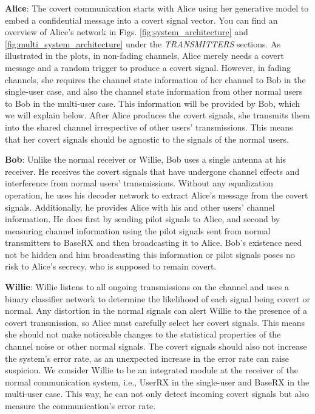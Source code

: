 \textbf{Alice}: The covert communication starts with Alice using her generative model to embed a confidential message into a covert signal vector. You can find an overview of Alice's network in Figs. \ref{fig:system_architecture} and \ref{fig:multi_system_architecture} under the \textit{TRANSMITTERS} sections. As illustrated in the plots, in non-fading channels, Alice merely needs a covert message and a random trigger to produce a covert signal. However, in fading channels, she requires the channel state information of her channel to Bob in the single-user case, and also the channel state information from other normal users to Bob in the multi-user case. This information will be provided by Bob, which we will explain below. After Alice produces the covert signals, she transmits them into the shared channel irrespective of other users' transmissions. This means that her covert signals should be agnostic to the signals of the normal users.

\textbf{Bob}: Unlike the normal receiver or Willie, Bob uses a single antenna at his receiver. He receives the covert signals that have undergone channel effects and interference from normal users' transmissions. Without any equalization operation, he uses his decoder network to extract Alice's message from the covert signals. Additionally, he provides Alice with his and other users' channel information. He does first by sending pilot signals to Alice, and second by measuring channel information using the pilot signals sent from normal transmitters to BaseRX and then broadcasting it to Alice. Bob's existence need not be hidden and him broadcasting this information or pilot signals poses no risk to Alice's secrecy, who is supposed to remain covert.

\textbf{Willie}: Willie listens to all ongoing transmissions on the channel and uses a binary classifier network to determine the likelihood of each signal being covert or normal. Any distortion in the normal signals can alert Willie to the presence of a covert transmission, so Alice must carefully select her covert signals. This means she should not make noticeable changes to the statistical properties of the channel noise or other normal signals. The covert signals should also not increase the system's error rate, as an unexpected increase in the error rate can raise suspicion. We consider Willie to be an integrated module at the receiver of the normal communication system, i.e., UserRX in the single-user and BaseRX in the multi-user case. This way, he can not only detect incoming covert signals but also measure the communication's error rate.

